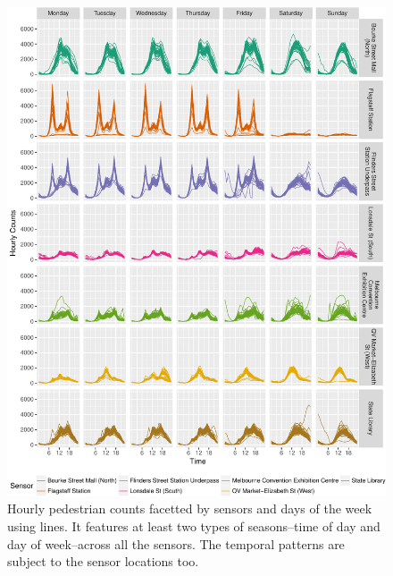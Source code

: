 \documentclass[article]{jss}
\begin{document}
\begin{CodeChunk}
\begin{figure}

{\centering \includegraphics[width=\textwidth]{figure/facet-time-1} 

}

\caption[Hourly pedestrian counts facetted by sensors and days of the week using lines]{Hourly pedestrian counts facetted by sensors and days of the week using lines. It features at least two types of seasons--time of day and day of week--across all the sensors. The temporal patterns are subject to the sensor locations too.}\label{fig:facet-time}
\end{figure}
\end{CodeChunk}
\end{document}
